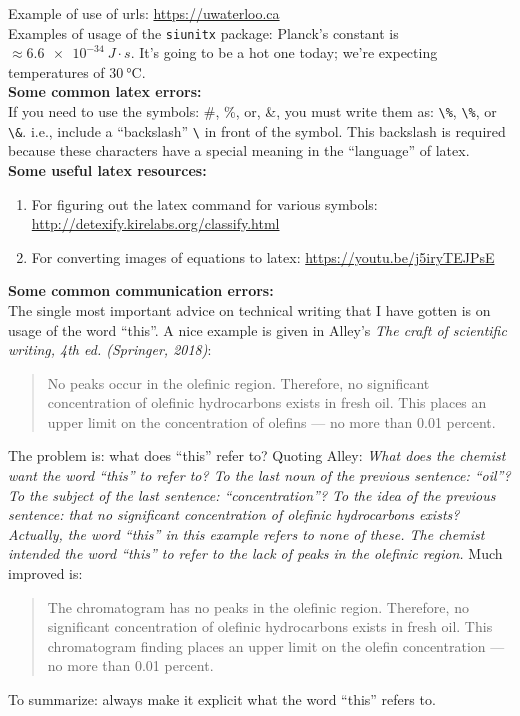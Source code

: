 \documentclass[11pt,usenames,dvipsnames]{article}
\begin{document}
\noindent
Example of use of urls: \url{https://uwaterloo.ca}\\

\noindent
Examples of usage of the \verb$siunitx$ package: Planck's constant is $ \approx \SI{6.6e-34}{J \cdot s}$.  It's going to be a hot one today; we're expecting temperatures of $\SI{30}{\celsius}$.\\

\noindent
{\bf Some common latex errors:}\\

\noindent
If you need to use the symbols: \#, \%, or, \&, you must write them as: \verb$\%$, \verb$\%$, or \verb$\&$.  i.e., include a ``backslash'' \verb$\$ in front of the symbol.  This backslash is required because these characters have a special meaning in the ``language'' of latex.\\

\noindent
{\bf Some useful latex resources:}\\

\begin{enumerate}
\item
For figuring out the latex command for various symbols:
\url{http://detexify.kirelabs.org/classify.html}

\item
For converting images of equations to latex:
\url{https://youtu.be/j5iryTEJPsE}
\end{enumerate}

\noindent
{\bf Some common communication errors:}\\

\noindent
The single most important advice on technical writing that I have gotten is on usage of the word ``this''.  A nice example is given in Alley's {\em The craft of scientific writing, 4th ed. (Springer, 2018)}:
\begin{quotation}\noindent
No peaks occur in the olefinic region. Therefore, no significant concentration of olefinic hydrocarbons exists in fresh oil. This places an upper limit on the concentration of olefins --- no more than 0.01 percent.
\end{quotation}
The problem is: what does ``this'' refer to?  Quoting Alley: \textit{What does the chemist want the word ``this'' to refer to? To the last noun of the previous sentence: ``oil''? To the subject of the last sentence: ``concentration''? To the idea of the previous sentence: that no significant concentration of olefinic hydrocarbons exists? Actually, the word ``this'' in this example refers to none of these. The chemist intended the word ``this'' to refer to the lack of peaks in the olefinic region.}
Much improved is:
\begin{quotation}\noindent
The chromatogram has no peaks in the olefinic region. Therefore, no significant concentration of olefinic hydrocarbons exists in fresh oil. This chromatogram finding places an upper limit on the olefin concentration --- no more than 0.01 percent.
\end{quotation}
To summarize: always make it explicit what the word ``this'' refers to.\\

\end{document}
